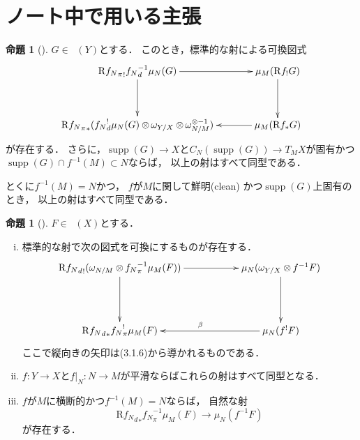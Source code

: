 \documentclass[leqno, 10pt, a4paper, dvipdfmx]{jsarticle}
\theoremstyle{definition}
\numberwithin{equation}{section}
\newcommand{\supp}{\mathop{\mathrm{supp}}\nolimits}
\newcommand{\Dompb}{\mathop{\mathsf{D}^\mathrm{b}}\nolimits}
\newcommand{\Rder}{\mathrm{R}}
\newcommand{\tens}[1][]{\mathbin{\otimes_{\raise1.5ex\hbox to-.1em{}{#1}}}}
\newcommand{\mres}[2][]{{\left.{#1}\right\rvert}_{#2}}
\theoremstyle{mystyle}
\newtheorem{PRP}[AXM]{命題}
\renewenvironment{leftbar}{%
  \def\FrameCommand{\textcolor{lightgray}{\vrule width 4pt} \hspace{10pt}}%
  \MakeFramed {\advance\hsize-\width \FrameRestore}}%
{\endMakeFramed}
\newcommand{\mpb}[1][]{{#1}_{\pi}} %
\newcommand{\mdiff}[1][]{{#1}_{d}} %
\begin{document}
\appendix
\section{ノート中で用いる主張}
\begin{leftbar}
\begin{PRP}[{\cite[Prop.4.3.4]{KS90}}]\label{prp4.3.4}
  \(G\in\Dompb(Y)\)とする．
  このとき，標準的な射による可換図式    
  \[    
      \vcenter{\xymatrix@C=36pt@R=36pt{
      \Rder{{\mpb[f_{N}]}_{!}}{\mdiff[f_{N}]^{-1}}\mu_{N}(G)
      \ar[d]
      \ar[r]
      &
      \mu_{M}(\Rder{f_{!}}G)
      \ar[d]
      \\
      \Rder{{\mpb[f_{N}]}_{\ast}}({\mdiff[f_{N}]^{!}}\mu_{N}(G)\tens[]\omega_{Y/X}\tens[]\omega_{N/M}^{\otimes{-1}})
      &
      \mu_{M}(\Rder{f_{\ast}}G)
      \ar[l]
      }}
  \]が存在する．
  さらに，\(\supp(G)\to X\)と\(
      C_N(\supp(G))\to T_{M}X
  \)が固有かつ\(\supp(G)\cap f^{-1}(M)\subset N\)ならば，
  以上の射はすべて同型である．
  
  とくに\(f^{-1}(M)=N\)かつ，
  \(f\)が\(M\)に関して鮮明\footnotemark[2] (clean) かつ\(\supp(G)\)上固有のとき，
  以上の射はすべて同型である．
\end{PRP}
\end{leftbar}
\begin{leftbar}
\begin{PRP}[{\cite[Prop.4.3.5]{KS90}}]\label{prp4.3.5}
  \(F\in\Dompb(X)\)とする．
  \begin{enumerate}[(i)]
      \item 標準的な射で次の図式を可換にするものが存在する．
      \[\vcenter{\xymatrix@C=56pt@R=46pt{
          \Rder{{\mdiff[f_N]}_{!}}(\omega_{N/M}\tens[]{\mpb[f_N]^{-1}}\mu_{M}(F))
          \ar[d]^{}
          \ar[r]_{}
          &
          \mu_{N}(\omega_{Y/X}\tens[]{f^{-1}}F)
          \ar[d]
          \\
          \Rder{{\mdiff[f_N]}_{\ast}}{\mpb[f_N]^{!}}\mu_{M}(F)
          &
          \mu_{N}({f^{!}}F)
          \ar[l]_{\beta}
      }}\]
      ここで縦向きの矢印は(3.1.6)から導かれるものである．
      \item \(f\colon Y\to X\)と\(\mres[f]{N}\colon N\to M\)が平滑ならばこれらの射はすべて同型となる．    
      \item \(f\)が\(M\)に横断的かつ\(f^{-1}(M)=N\)ならば，
      自然な射\[
          \Rder{{\mdiff[f_N]}_{\ast}}\mpb[f_N]^{-1}\mu_{M}(F)
          \to \mu_{N}(f^{-1}F)
      \]が存在する．
  \end{enumerate}
\end{PRP}
\end{leftbar}
\end{document}
